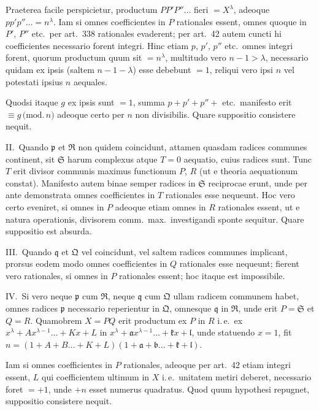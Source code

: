 \documentclass[12pt,a4paper]{article}
\theoremstyle{plain}
\theoremstyle{definition}
\theoremstyle{remark}
\begin{document}
Praeterea facile perspicietur, productum $PP'P''\ldots$ fieri $=X^{\lambda}$, adeoque $pp'p''\ldots=n^{\lambda}$. Iam si omnes coefficientes in $P$ rationales essent, omnes quoque in $P'$, $P''$ etc.\ per art.\ 338 rationales evaderent; per art.\ 42 autem cuncti hi coefficientes necessario forent integri. Hinc etiam $p$, $p'$, $p''$ etc.\ omnes integri forent, quorum productum quum sit $=n^{\lambda}$, multitudo vero $n-1>\lambda$, necessario quidam ex ipsis (saltem $n-1-\lambda$) esse debebunt $=1$, reliqui vero ipsi $n$ vel potestati ipsius $n$ aequales.

Quodsi itaque $g$ ex ipsis sunt $=1$, summa $p+p'+p''+$ etc.\ manifesto erit $\equiv g\,\mathrm{(mod.}\,n)$ adeoque certo per $n$ non divisibilis. Quare suppositio consistere nequit.

\textsc{II.}\ Quando $\mathfrak{p}$ et $\mathfrak{R}$ non quidem coincidunt, attamen quasdam radices communes continent, sit $\mathfrak{S}$ harum complexus atque $T=0$ aequatio, cuius radices sunt. Tunc $T$ erit divisor communis maximus functionum $P$, $R$ (ut e theoria aequationum constat). Manifesto autem binae semper radices in $\mathfrak{S}$ reciprocae erunt, unde per ante demonstrata omnes coefficientes in $T$ rationales esse nequeunt. Hoc vero certo eveniret, si omnes in $P$ adeoque etiam omnes in $R$ rationales essent, ut e natura operationis, divisorem comm.\ max.\ investigandi sponte sequitur. Quare suppositio est absurda.

\textsc{III.}\ Quando $\mathfrak{q}$ et $\mathfrak{Q}$ vel coincidunt, vel saltem radices communes implicant, prorsus eodem modo omnes coefficientes in $Q$ rationales esse nequeunt; fierent vero rationales, si omnes in $P$ rationales essent; hoc itaque est impossibile.

\textsc{IV.}\ Si vero neque $\mathfrak{p}$ cum $\mathfrak{R}$, neque $\mathfrak{q}$ cum $\mathfrak{Q}$ ullam radicem communem habet, omnes radices $\mathfrak{p}$ necessario reperientur in $\mathfrak{Q}$, omnesque $\mathfrak{q}$ in $\mathfrak{R}$, unde erit $P=\mathfrak{S}$ et $Q=R$. Quamobrem $X=PQ$ erit productum ex $P$ in $R$ i.\,e.\ ex $x^\lambda+Ax^{\lambda-1}\ldots+Kx+L$ in $x^\lambda+\mathfrak{a}x^{\lambda-1}\ldots+\mathfrak{k}x+\mathfrak{l}$, unde statuendo $x=1$, fit $n=(1+A+B\ldots+K+L)(1+\mathfrak{a}+\mathfrak{b}\ldots+\mathfrak{k}+\mathfrak{l})$.

Iam si omnes coefficientes in $P$ rationales, adeoque per art.\ 42 etiam integri essent, $L$ qui coefficientem ultimum in $X$ i.\,e.\ unitatem metiri deberet, necessario foret $=+1$, unde $+n$ esset numerus quadratus. Quod quum hypothesi repugnet, suppositio consistere nequit.
\end{document}
